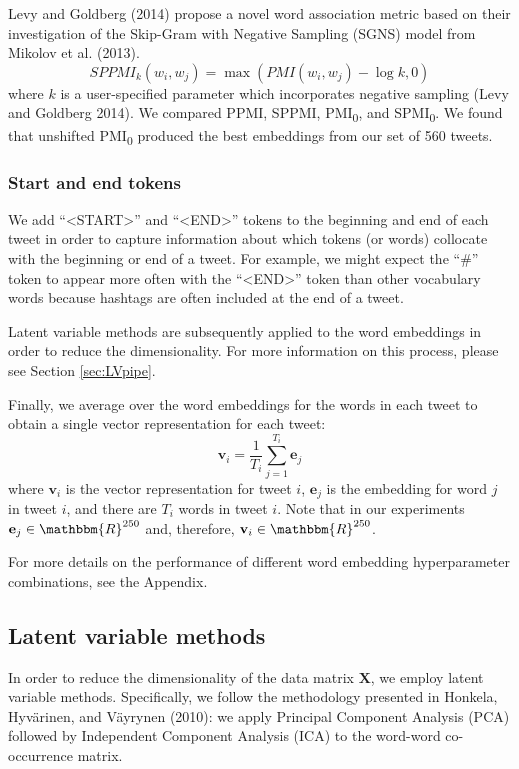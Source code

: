 \documentclass{article}
\begin{document}
Levy and Goldberg (2014) propose a novel word association metric based
on their investigation of the Skip-Gram with Negative Sampling (SGNS)
model from Mikolov et al. (2013).
\[SPPMI_k(w_i, w_j) = \max(PMI(w_i, w_j) - \log k, 0)\] where \(k\) is a
user-specified parameter which incorporates negative sampling (Levy and
Goldberg 2014). We compared PPMI, SPPMI, PMI\textsubscript{0}, and
SPMI\textsubscript{0}. We found that unshifted PMI\textsubscript{0}
produced the best embeddings from our set of 560 tweets.

\hypertarget{start-and-end-tokens}{%
\subsubsection{Start and end tokens}\label{start-and-end-tokens}}

We add ``\textless START\textgreater{}'' and
``\textless END\textgreater{}'' tokens to the beginning and end of each
tweet in order to capture information about which tokens (or words)
collocate with the beginning or end of a tweet. For example, we might
expect the ``\#'' token to appear more often with the
``\textless END\textgreater{}'' token than other vocabulary words
because hashtags are often included at the end of a tweet.

Latent variable methods are subsequently applied to the word embeddings
in order to reduce the dimensionality. For more information on this
process, please see Section \ref{sec:LVpipe}.

Finally, we average over the word embeddings for the words in each tweet
to obtain a single vector representation for each tweet:
\[\mathbf{v}_i=\frac {1} {T_i} \sum_{j=1}^{T_i}{\mathbf{e}_j}\] where
\(\mathbf{v}_i\) is the vector representation for tweet \(i\),
\(\mathbf{e}_j\) is the embedding for word \(j\) in tweet \(i\), and
there are \(T_i\) words in tweet \(i\). Note that in our experiments
\(\mathbf{e}_j \in \mathbbm{R}^{250}\) and, therefore,
\(\mathbf{v}_i \in \mathbbm{R}^{250}\).

For more details on the performance of different word embedding
hyperparameter combinations, see the Appendix.

\hypertarget{latent-variable-methods}{%
\subsection{Latent variable methods}\label{latent-variable-methods}}

In order to reduce the dimensionality of the data matrix \(\mathbf{X}\),
we employ latent variable methods. Specifically, we follow the
methodology presented in Honkela, Hyvärinen, and Väyrynen (2010): we
apply Principal Component Analysis (PCA) followed by Independent
Component Analysis (ICA) to the word-word co-occurrence matrix.
\end{document}
